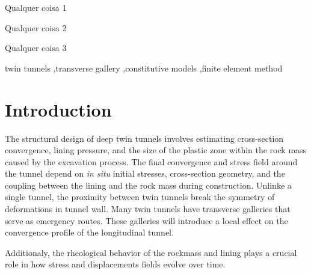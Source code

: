 \documentclass[a4paper,fleqn]{cas-sc}
\begin{document}

\begin{highlights}
	\item Qualquer coisa 1
	\item Qualquer coisa 2
	\item Qualquer coisa 3 
\end{highlights}

\begin{keywords}
twin tunnels \sep transverse gallery \sep constitutive models \sep finite element method
\end{keywords}

\maketitle

\section{Introduction}\label{}

The structural design of deep twin tunnels involves estimating cross-section convergence, lining pressure, and the size of the plastic zone within the rock mass caused by the excavation process. The final convergence and stress field around the tunnel depend on \textit{in situ} initial stresses, cross-section geometry, and the coupling between the lining and the rock mass during construction. Unlinke a single tunnel, the proximity between twin tunnels break the symmetry of deformations in tunnel wall. Many twin tunnels have transverse galleries that serve as emergency routes. These galleries will introduce a local effect on the convergence profile of the longitudinal tunnel. 

Additionaly, the rheological behavior of the rockmass and lining plays a crucial role in how stress and displacements fields evolve over time.

\end{document}
